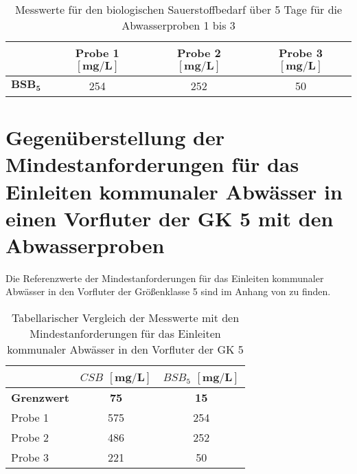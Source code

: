 \vspace*{-2.5mm}
\renewcommand{\arraystretch}{1.2}
\begin{table}[h!]
	\centering
	\caption{Messwerte für den biologischen Sauerstoffbedarf über 5 Tage für die Abwasserproben 1 bis 3}
	\label{tab:bsb}
	\begin{tabulary}{1.7\textwidth}{L|C|C|C}
		\hline
		& \textbf{Probe 1 $\boldsymbol{\left[\si{\milli \gram \per \liter}\right]}$}& \textbf{Probe 2 $\boldsymbol{\left[\si{\milli \gram \per \liter}\right]}$} & \textbf{Probe 3 $\boldsymbol{\left[\si{\milli \gram \per \liter}\right]}$}  \\ 
		\hline
		\textbf{$\boldsymbol{BSB_5}$}& 254 & 252 & 50 \\
		\hline
	\end{tabulary}
\end{table}
\FloatBarrier


\newpage

\section{Gegenüberstellung der Mindestanforderungen für das Einleiten kommunaler Abwässer in einen Vorfluter der GK 5 mit den Abwasserproben}
Die Referenzwerte der Mindestanforderungen für das Einleiten kommunaler Abwässer in den Vorfluter der Größenklasse 5 sind im Anhang von \cite[S. 29]{Skript} zu finden.
\vspace*{-2.5mm}
\renewcommand{\arraystretch}{1.2}
\begin{table}[h!]
	\centering
	\caption{Tabellarischer Vergleich der Messwerte mit den Mindestanforderungen für das Einleiten kommunaler Abwässer in den Vorfluter der GK 5}
	\label{tab_vgl}
	\begin{tabulary}{1.2\textwidth}{l|C|C}
		\hline
		 & \textbf{$CSB$} $\boldsymbol{\left[\si{\milli\gram\per\liter}\right]}$ & \textbf{$BSB_5$} $\boldsymbol{\left[\si{\milli\gram\per\liter}\right]}$\\
		\hline
		\textbf{Grenzwert} & \textbf{75} & \textbf{15}  \\
		\hline
		Probe 1 & 575 & 254 \\
		Probe 2 & 486 & 252\\
		Probe 3 & 221 & 50\\
		\hline
	\end{tabulary}
\end{table}
\FloatBarrier

